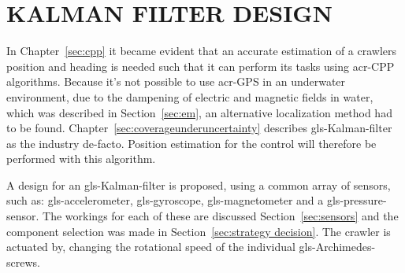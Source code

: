 \section{KALMAN FILTER DESIGN}\label{sec:kalman design}

In Chapter~\ref{sec:cpp} it became evident that an accurate estimation of a crawlers position and heading is needed
such that it can perform its tasks using \gls{acr-CPP} algorithms. Because it's not possible to use \gls{acr-GPS} in an
underwater environment, due to the dampening of electric and magnetic fields in water, which was described in
Section~\ref{sec:em}, an alternative localization method had to be found. Chapter~\ref{sec:coverageunderuncertainty}
describes \gls{gls-Kalman-filter} as the industry de-facto. Position estimation for the control will therefore be
performed with this algorithm.

A design for an \gls{gls-Kalman-filter} is proposed, using a common array of sensors, such as: \gls{gls-accelerometer},
\gls{gls-gyroscope}, \gls{gls-magnetometer} and a \gls{gls-pressure-sensor}. The workings for each of these are
discussed Section~\ref{sec:sensors} and the component selection was made in Section~\ref{sec:strategy decision}. The
crawler is actuated by, changing the rotational speed of the individual \gls{gls-Archimedes-screw}s.


